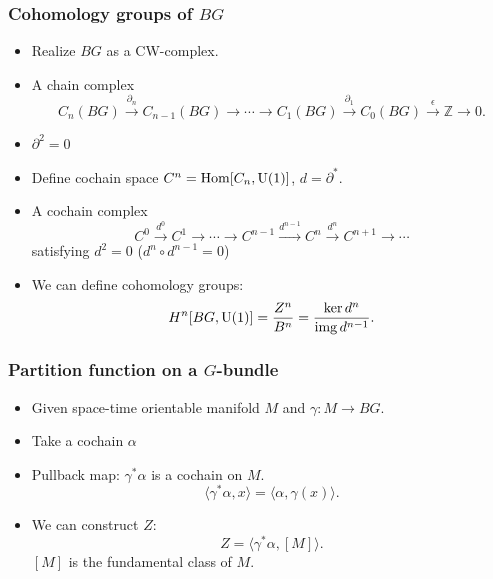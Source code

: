 \documentclass[xcolor=table, aspectratio=43,ignorenonframetext]{beamer}
\DeclareMathOperator{\img}{img}
\DeclareMathOperator{\hhom}{Hom}
\begin{document}
\begin{frame}
	\frametitle{Cohomology groups of $BG$}
	\begin{itemize}
		\item Realize $BG$ as a CW-complex.
		\item A chain complex
		\[C_n(BG)\xrightarrow{\partial_n}
		C_{n-1}(BG)\rightarrow\cdots\rightarrow
		C_1(BG)\xrightarrow{\partial_1}
		C_0(BG)\xrightarrow{\epsilon}\mathbb Z\rightarrow0.\]
		\item $\partial^2=0$
		\item Define cochain space $C^n=\hhom[C_n,\text U(1)]$, $d = \partial^\ast$.
		\item A cochain complex
		\[C^0\xrightarrow{d^0}C^1\rightarrow\cdots\rightarrow C^{n-1}\xrightarrow{d^{n-1}}C^n\xrightarrow{d^n}C^{n+1}\rightarrow\cdots\]
		satisfying $d^2=0$ ($d^n\circ d^{n-1}=0$)
		\item We can define cohomology groups:
		\[H^n[BG,\text U(1)] = \frac{Z^n}{B^n} = \frac{\ker d^n}{\img d^{n-1}}.\]
	\end{itemize}
\end{frame}

\begin{frame}
	\frametitle{Partition function on a $G$-bundle}
	\begin{itemize}
		\item Given space-time orientable manifold $M$ and $\gamma:M\rightarrow BG$.
		\item Take a cochain $\alpha$
		\item Pullback map: $\gamma^\ast\alpha$ is a cochain on $M$.
		\[\langle \gamma^\ast\alpha, x\rangle = \langle \alpha,\gamma(x)\rangle.\]
		\item We can construct $Z$:
		\[Z = \langle\gamma^\ast\alpha, [M]\rangle.\]
		$[M]$ is the fundamental class of $M$.
	\end{itemize}
\end{frame}
\end{document}
